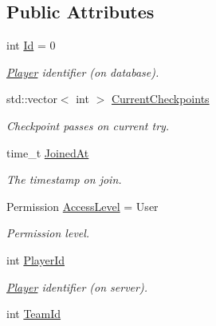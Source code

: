 \subsection*{Public Attributes}
\begin{DoxyCompactItemize}
\item 
\hypertarget{structPlayer_a27cd3355e96dc3842d4f91b859673e0c}{int \hyperlink{structPlayer_a27cd3355e96dc3842d4f91b859673e0c}{Id} = 0}\label{structPlayer_a27cd3355e96dc3842d4f91b859673e0c}

\begin{DoxyCompactList}\small\item\em \hyperlink{structPlayer}{Player} identifier (on database). \end{DoxyCompactList}\item 
\hypertarget{structPlayer_aa6efdb36b3a3618f26bf85c3a9b216d8}{std\-::vector$<$ int $>$ \hyperlink{structPlayer_aa6efdb36b3a3618f26bf85c3a9b216d8}{Current\-Checkpoints}}\label{structPlayer_aa6efdb36b3a3618f26bf85c3a9b216d8}

\begin{DoxyCompactList}\small\item\em Checkpoint passes on current try. \end{DoxyCompactList}\item 
\hypertarget{structPlayer_a8c221131108dd948b17c6eb68cd1b4db}{time\-\_\-t \hyperlink{structPlayer_a8c221131108dd948b17c6eb68cd1b4db}{Joined\-At}}\label{structPlayer_a8c221131108dd948b17c6eb68cd1b4db}

\begin{DoxyCompactList}\small\item\em The timestamp on join. \end{DoxyCompactList}\item 
\hypertarget{structPlayer_aa83b14faf5c02be9dd38c6963b245916}{Permission \hyperlink{structPlayer_aa83b14faf5c02be9dd38c6963b245916}{Access\-Level} = User}\label{structPlayer_aa83b14faf5c02be9dd38c6963b245916}

\begin{DoxyCompactList}\small\item\em Permission level. \end{DoxyCompactList}\item 
\hypertarget{structPlayer_a6a71d7d9837a0a12e52ca47930965e0f}{int \hyperlink{structPlayer_a6a71d7d9837a0a12e52ca47930965e0f}{Player\-Id}}\label{structPlayer_a6a71d7d9837a0a12e52ca47930965e0f}

\begin{DoxyCompactList}\small\item\em \hyperlink{structPlayer}{Player} identifier (on server). \end{DoxyCompactList}\item 
\hypertarget{structPlayer_a350919664ba73d6d6cd6d03bd2a5cacd}{int \hyperlink{structPlayer_a350919664ba73d6d6cd6d03bd2a5cacd}{Team\-Id}}\label{structPlayer_a350919664ba73d6d6cd6d03bd2a5cacd}


\end{DoxyCompactItemize}
